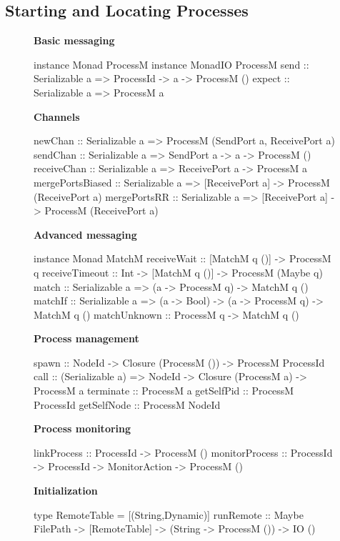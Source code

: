 \documentclass[preprint]{sigplanconf}
\begin{document}
\subsection{Starting and Locating Processes}

\begin{figure}[t!]
\small
\renewcommand{\baselinestretch}{0.80}
\newcommand{\apisection}[1]{\textbf{#1} \vspace{-0.5ex}}
\apisection{Basic messaging}
\begin{code}
instance Monad ProcessM
instance MonadIO ProcessM
send   :: Serializable a => ProcessId -> a
       -> ProcessM ()
expect :: Serializable a => ProcessM a
\end{code}
 \apisection{Channels}
\begin{code}
newChan  :: Serializable a 
         => ProcessM (SendPort a, ReceivePort a)
sendChan :: Serializable a 
         => SendPort a -> a -> ProcessM ()
receiveChan :: Serializable a => ReceivePort a
            -> ProcessM a
mergePortsBiased :: Serializable a => [ReceivePort a]
                 -> ProcessM (ReceivePort a)
mergePortsRR :: Serializable a => [ReceivePort a] 
             -> ProcessM (ReceivePort a)
\end{code}

 \apisection{Advanced messaging}
\begin{code}
instance Monad MatchM
receiveWait    :: [MatchM q ()] -> ProcessM q
receiveTimeout :: Int -> [MatchM q ()] 
               -> ProcessM (Maybe q)
match   :: Serializable a => (a -> ProcessM q) 
        -> MatchM q ()
matchIf :: Serializable a => (a -> Bool) 
        -> (a -> ProcessM q) -> MatchM q ()
matchUnknown :: ProcessM q -> MatchM q ()
\end{code}

 \apisection{Process management}
\begin{code}
spawn :: NodeId -> Closure (ProcessM ()) 
      -> ProcessM ProcessId
call :: (Serializable a) => NodeId -> 
        Closure (ProcessM a) -> ProcessM a
terminate :: ProcessM a
getSelfPid :: ProcessM ProcessId
getSelfNode :: ProcessM NodeId
\end{code}

 \apisection{Process monitoring}
\begin{code}
linkProcess :: ProcessId -> ProcessM ()
monitorProcess :: ProcessId -> ProcessId 
               -> MonitorAction -> ProcessM ()
\end{code}

 \apisection{Initialization}
\begin{code}
type RemoteTable = [(String,Dynamic)]
runRemote      :: Maybe FilePath -> [RemoteTable] 
               -> (String -> ProcessM ()) -> IO ()


\end{code}
\end{figure}
\end{document}
